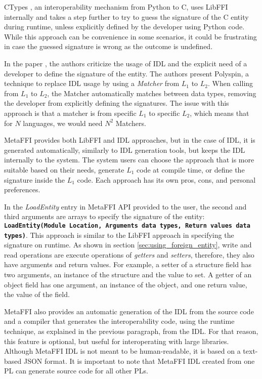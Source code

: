 \documentclass[sigplan,10pt,manuscript,nonacm]{acmart}
\begin{document}
CTypes \cite{python_ctypes}, an interoperability mechanism from Python to C, uses LibFFI internally and takes a step further to try to guess the signature of the C entity during runtime, unless explicitly defined by the developer using Python code. While this approach can be convenience in some scenarios, it could be frustrating in case the guessed signature is wrong as the outcome is undefined.

In the paper \cite{polyspin}, the authors criticize the usage of IDL and the explicit need of a developer to define the signature of the entity. The authors present Polyspin, a technique to replace IDL usage by using a \textit{Matcher} from $L_1$ to $L_2$. When calling from $L_1$ to $L_2$, the Matcher automatically matches between data types, removing the developer from explicitly defining the signatures. The issue with this approach is that a matcher is from specific $L_1$ to specific $L_2$, which means that for $N$ languages, we would need $N^2$ Matchers.

MetaFFI provides both LibFFI and IDL approaches, but in the case of IDL, it is generated automatically, similarly to IDL generation tools, but keeps the IDL internally to the system. The system users can choose the approach that is more suitable based on their needs, generate $L_1$ code at compile time, or define the signature inside the $L_1$ code. Each approach has its own pros, cons, and personal preferences.

In the \textit{LoadEntity} entry in MetaFFI API provided to the user, the second and third arguments are arrays to specify the signature of the entity: \texttt{\textbf{LoadEntity(Module Location, Arguments data types, Return values data types)}}. This approach is similar to the LibFFI approach in specifying the signature on runtime. As shown in section \ref{sec:using_foreign_entity}, write and read operations are execute operations of \textit{getters} and \textit{setters}, therefore, they also have arguments and return values. For example, a setter of a structure field has two arguments, an instance of the structure and the value to set. A getter of an object field has one argument, an instance of the object, and one return value, the value of the field.

MetaFFI also provides an automatic generation of the IDL from the source code and a compiler that generates the interoperability code, using the runtime technique, as explained in the previous paragraph, from the IDL. For that reason, this feature is optional, but useful for interoperating with large libraries. Although MetaFFI IDL is not meant to be human-readable, it is based on a text-based JSON format. It is important to note that MetaFFI IDL created from one PL can generate source code for all other PLs.
\end{document}
